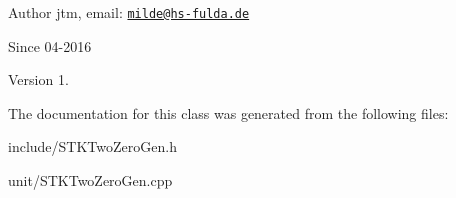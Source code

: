 \begin{DoxyAuthor}{Author}
jtm, email\-:  \href{mailto:milde@hs-fulda.de}{\tt milde@hs-\/fulda.\-de} 
\end{DoxyAuthor}
\begin{DoxySince}{Since}
04-\/2016 
\end{DoxySince}
\begin{DoxyVersion}{Version}
1. 
\end{DoxyVersion}


The documentation for this class was generated from the following files\-:\begin{DoxyCompactItemize}
\item 
include/S\-T\-K\-Two\-Zero\-Gen.\-h\item 
unit/S\-T\-K\-Two\-Zero\-Gen.\-cpp\end{DoxyCompactItemize}
